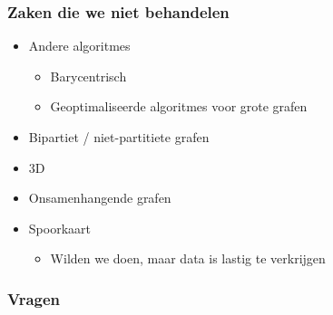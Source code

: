 \documentclass[16pt]{beamer}
\begin{document}
\begin{frame}
    \frametitle{Zaken die we niet behandelen}
    \begin{itemize}
        \item{Andere algoritmes}
        \begin{itemize}
            \item{Barycentrisch}
            \item{Geoptimaliseerde algoritmes voor grote grafen}
        \end{itemize}
        \item{Bipartiet / niet-partitiete grafen}
        \item{3D}
        \item{Onsamenhangende grafen}
        \item{Spoorkaart}
        \begin{itemize}
            \item{Wilden we doen, maar data is lastig te verkrijgen}
        \end{itemize}
    \end{itemize}
\end{frame}


\begin{frame}
    \frametitle{Vragen}
\end{frame}
\end{document}
